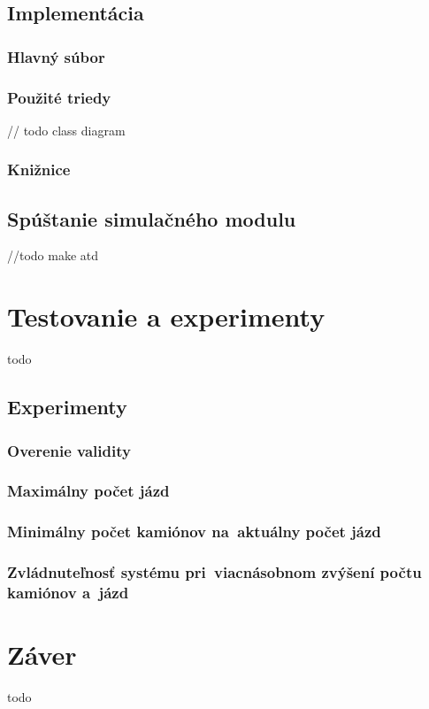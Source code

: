 \documentclass[a4paper, 11pt]{article}
\begin{document}
    \subsection{Implementácia}
    \subsubsection{Hlavný súbor}
    \subsubsection{Použité triedy}
    // todo class diagram
    \subsubsection{Knižnice}
    \subsection{Spúštanie simulačného modulu}
    //todo make atd

    \newpage
	\section{Testovanie a experimenty}
	todo 
    \subsection{Experimenty}
    \subsubsection{Overenie validity}
    \subsubsection{Maximálny počet jázd}
    \subsubsection{Minimálny počet kamiónov na~aktuálny počet jázd}
    \subsubsection{Zvládnuteľnosť systému pri~viacnásobnom zvýšení počtu kamiónov a~jázd}

    \newpage
	\section{Záver}
	todo 
\end{document}
